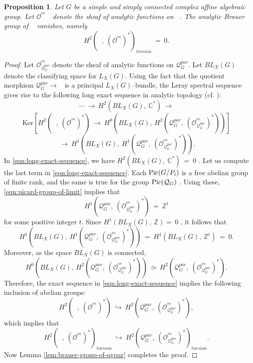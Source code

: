 \documentclass[10pt,reqno]{amsart}
\DeclareMathOperator{\Pic}{\textnormal{Pic}}
\DeclareMathOperator{\mgpar}{\mc{M}_G^{par}}
\newcommand{\mc}[1]{\mathcal{#1}}
\newcommand{\bb}[1]{\mathbb{#1}}
\renewcommand{\ker}{\mathrm{Ker}}
\newtheorem{proposition}[theorem]{Proposition}
\theoremstyle{myroman}
\numberwithin{equation}{section}
\begin{document}
		\begin{proposition}\label{prop:analytic-brauer-group-vanishing}
			Let $G$ be a simple and simply connected complex affine algebraic group. Let
			$\mc{O}^{^{an}}_{\mgpar}$\ \ denote the sheaf of analytic functions on $\mgpar$. The analytic Brauer group of $\mgpar$ vanishes, namely $$H^2\left(\mgpar,\ (\mc{O}^{^{an}}_{\mgpar})^*\right)_{torsion}\ =\ 0.$$
		\end{proposition}
		
		\begin{proof}
			Let $\mc{O}^{^{an}}_{\mc{Q}_G^{par}}$ denote the sheaf of analytic functions on $\mc{Q}^{par}_G$. Let
			$BL_X(G)$ denote the classifying space for $L_X(G)$. Using the fact that the quotient morphism $\mc{Q}_G^{par}\longrightarrow \mgpar$ is a principal $L_X(G)$--bundle, the Leray spectral sequence gives rise to the following long exact sequence in analytic topology (cf. \cite[(4.1)]{BH13}):
			\begin{equation}\label{eqn:long-exact-sequence}
				\cdots\ \longrightarrow\ H^2\left(BL_X(G),\  \bb{C}^*\right)\ \longrightarrow
			\end{equation}
			$$
			\ker\left[H^2\left(\mgpar, \
			(\mc{O}^{^{an}}_{\mgpar})^*\right)\ \longrightarrow\
			H^0\left(BL_X(G),\ H^2\left(\mc{Q}_G^{par},\ (\mc{O}^{^{an}}_{\mc{Q}_G^{par}})^*\right)\right)\right]
			$$
			$$
			\ \longrightarrow\ H^1\left(BL_X(G),\ H^1\left(\mc{Q}^{par}_G,\ (\mc{O}^{^{an}}_{\mc{Q}_G^{par}})^*\right)\right).
			$$
			In \eqref{eqn:long-exact-sequence}, we have $H^2\left(BL_X(G),\ \bb{C}^*\right) \ =\ 0$  \cite[Proposition 3.4]{BH13}. Let us compute the last term in \eqref{eqn:long-exact-sequence}. 
			Each $\Pic(G/P_i)$ is a free abelian group of finite rank, and the same is true for the group
			$\Pic(\mc{Q}_G)$ \cite[Lemma 1.4]{BLS98}. Using these, \eqref{eqn:picard-group-of-limit}
			implies that $$H^1\left(\mc{Q}^{par}_G,\ (\mc{O}^{^{an}}_{\mc{Q}_G^{par}})^*\right)\ =\ \bb{Z}^t$$ 
			for some positive integer $t$. Since $H^1(BL_X(G), \ \bb{Z})  =\ 0$ \cite[Proposition 3.4]{BH13}, it follows that
			\begin{equation*}
				H^1\left(BL_X(G),\ H^1\left(\mc{Q}^{par}_G,\ (\mc{O}^{^{an}}_{\mc{Q}_G^{par}})^*\right)\right)\ =\ H^1\left(BL_X(G),\ \bb{Z}^t\right)\ = \ 0.
			\end{equation*}
			Moreover, as the space $BL_X(G)$ is connected,
			$$H^0\left(BL_X(G),\ H^2\left(\mc{Q}_G^{par},\ (\mc{O}^{^{an}}_{\mc{Q}_G^{par}})^*\right)
			\right)\ \simeq\  H^2\left(\mc{Q}_G^{par},\ (\mc{O}^{^{an}}_{\mc{Q}_G^{par}})^*\right).$$
			Therefore, the exact sequence in \eqref{eqn:long-exact-sequence} implies the following inclusion of abelian groups:
			$$
			H^2\left(\mgpar,\ (\mc{O}^{^{an}}_{\mgpar})^*\right)\ \hookrightarrow\  H^2\left(\mc{Q}_G^{par}, \
			(\mc{O}^{^{an}}_{\mc{Q}_G^{par}})^*\right),
			$$
			which implies that
			$$
			H^2\left(\mgpar,\ (\mc{O}^{^{an}}_{\mgpar})^*\right)_{torsion}\ 
			\hookrightarrow\  H^2\left(\mc{Q}_G^{par}, \ (\mc{O}^{^{an}}_{\mc{Q}_G^{par}})^*\right)_{torsion}.
			$$
			Now Lemma \ref{lem:brauer-group-of-qgpar} completes the proof.
		\end{proof}
		
\end{document}

